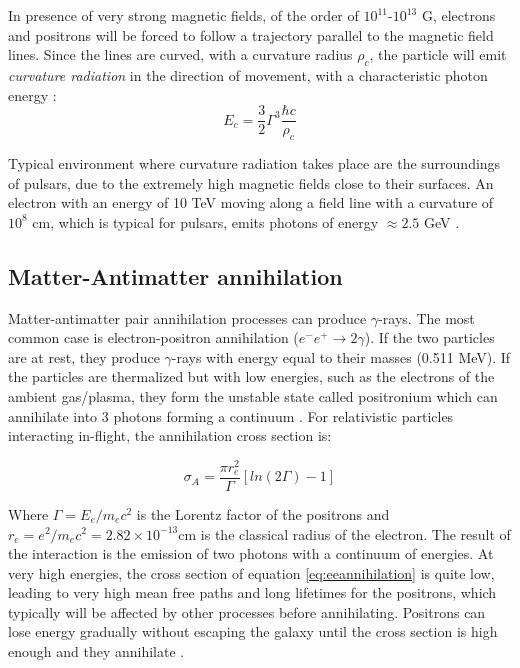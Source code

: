 \documentclass[main.tex]{subfiles}
\begin{document}
In presence of very strong magnetic fields, of the order of $10^{11}$-$10^{13}$ G, electrons and positrons will be forced to follow a trajectory parallel to the magnetic field lines. Since the lines are curved, with a curvature radius $\rho_{c}$, the particle will emit \textit{curvature radiation} in the direction of movement, with a characteristic photon energy \cite{Pulsars}:
\begin{equation}
    E_{c} = \frac{3}{2} \Gamma^3\frac{\hbar c}{\rho_c}
\end{equation}

Typical environment where curvature radiation takes place are the surroundings of pulsars, due to the extremely high magnetic fields close to their surfaces. An electron with an energy of 10 TeV moving along a field line with a curvature of $10^8$ cm, which is typical for pulsars, emits photons of energy $\approx 2.5$ GeV \cite{1993MurthyGammaRay}. 



\subsection{Matter-Antimatter annihilation}

Matter-antimatter pair annihilation processes can produce $\gamma$-rays. The most common case is electron-positron annihilation ($e^-e^+\rightarrow 2\gamma$). If the two particles are at rest, they produce $\gamma$-rays with energy equal to their masses (0.511 MeV). If the particles are thermalized but with low energies, such as the electrons of the ambient gas/plasma, they form the unstable state called positronium which can annihilate into 3 photons forming a continuum \cite{2004VHECosmicGammaRadiation}.
For relativistic particles interacting in-flight, the annihilation cross section is:

\begin{equation}\label{eq:eeannihilation}
    \sigma_{A} = \frac{\pi r_{e}^{2}}{\Gamma} [ln(2\Gamma)-1]
\end{equation}

Where $\Gamma=E_e/m_ec^2$ is the Lorentz factor of the positrons and $r_e=e^2/m_ec^2 = 2.82 \times 10^{-13} $cm is the classical radius of the electron. The result of the interaction is the emission of two photons with a continuum of energies. At very high energies, the cross section of equation \ref{eq:eeannihilation} is quite low, leading to very high mean free paths and long lifetimes for the positrons, which typically will be affected by other processes before annihilating. Positrons can lose energy gradually without escaping the galaxy until the cross section is high enough and they annihilate \cite{1993MurthyGammaRay}.
\end{document}
